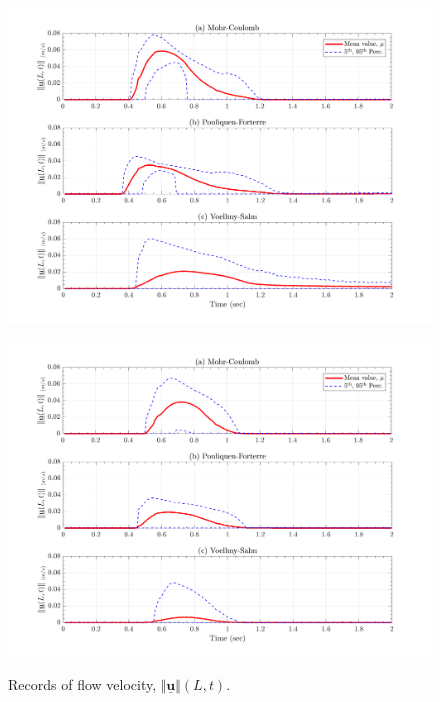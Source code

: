 \documentclass{article}
\begin{document}
\begin{figure}[H]
	\begin{minipage}[b]{0.5\linewidth}
    	\centering
    	\includegraphics[width=1\textwidth]{InclinedPlane/Velocity/Vel_L3.png}
    	\label{fig:Ramp-L3-Vel}
	\end{minipage}
	\begin{minipage}[b]{0.5\linewidth}
		\centering
		\includegraphics[width=1\textwidth]{InclinedPlane/Velocity/Vel_L4.png}
    	\label{fig:Ramp-L4-Vel}
    \end{minipage}
    \caption{Records of flow velocity, $\Vert \underline{\mathbf{u}} \Vert(L,t)$.}
    \label{fig:Ramp-LM-Vel}
\end{figure}
\end{document}
